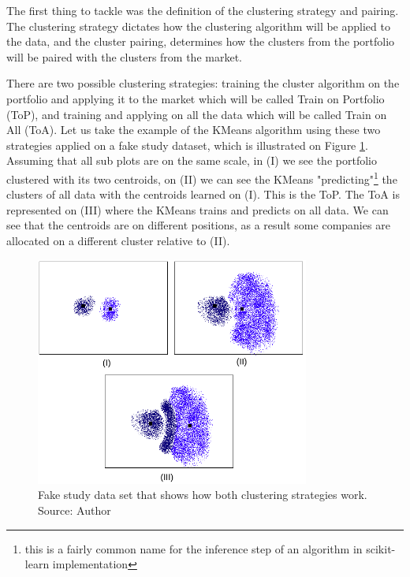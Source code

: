 \newcommand{\nameClusterStrategyA}{ToP}
\newcommand{\nameClusterStrategyB}{ToA}
\newcommand{\nameClusterPairingA}{OvO}
\newcommand{\nameClusterPairingB}{OvA}


The first thing to tackle was the definition of the clustering strategy and pairing. The clustering strategy dictates how the clustering algorithm will be applied to the data, and the cluster pairing, determines how the clusters from the portfolio will be paired with the clusters from the market.

There are two possible clustering strategies: training the cluster algorithm on the portfolio and applying it to the market which will be called Train on Portfolio (\nameClusterStrategyA{}), and training and applying on all the data which will be called Train on All (\nameClusterStrategyB{}). Let us take the example of the KMeans algorithm using these two strategies applied on a fake study dataset, which is illustrated on Figure \ref{fig:cluster-strategy}. Assuming that all sub plots are on the same scale, in (I) we see the portfolio clustered with its two centroids, on (II) we can see the KMeans "predicting"\footnote{this is a fairly common name for the inference step of an algorithm in scikit-learn implementation} the clusters of all data with the centroids learned on (I). This is the \nameClusterStrategyA{}. The \nameClusterStrategyB{} is represented on (III) where the KMeans trains and predicts on all data. We can see that the centroids are on different positions, as a result some companies are allocated on a different cluster relative to (II). 

\begin{figure}[h]
   \centering
   \includegraphics[width=9cm]{fig/ch3-cluster-strategy.png}
   \caption{Fake study data set that shows how both clustering strategies work. Source: Author}
   \label{fig:cluster-strategy}
\end{figure}

